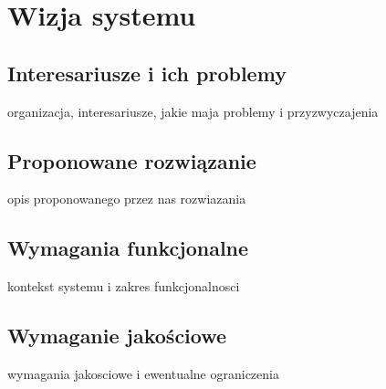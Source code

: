 \section{Wizja systemu}

\subsection{Interesariusze i ich problemy}

organizacja, interesariusze, jakie maja problemy i przyzwyczajenia

\subsection{Proponowane rozwiązanie}

opis proponowanego przez nas rozwiazania

\subsection{Wymagania funkcjonalne}

kontekst systemu i zakres funkcjonalnosci

\subsection{Wymaganie jakościowe}

wymagania jakosciowe i ewentualne ograniczenia